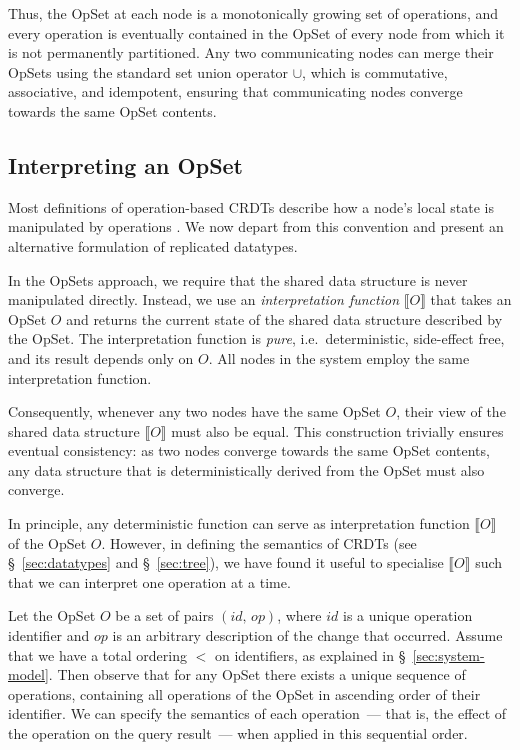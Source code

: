 Thus, the OpSet at each node is a monotonically growing set of operations, and every operation is eventually contained in the OpSet of every node from which it is not permanently partitioned.
Any two communicating nodes can merge their OpSets using the standard set union operator $\cup$, which is commutative, associative, and idempotent, ensuring that communicating nodes converge towards the same OpSet contents.

\subsection{Interpreting an OpSet}\label{sec:op-serial}

Most definitions of operation-based CRDTs describe how a node's local state is manipulated by operations \cite{Shapiro:2011wy,Shapiro:2011un}.
We now depart from this convention and present an alternative formulation of replicated datatypes.

In the OpSets approach, we require that the shared data structure is never manipulated directly.
Instead, we use an \emph{interpretation function} $\llbracket O \rrbracket$ that takes an OpSet $O$ and returns the current state of the shared data structure described by the OpSet.
The interpretation function is \emph{pure}, i.e.\ deterministic, side-effect free, and its result depends only on $O$.
All nodes in the system employ the same interpretation function.

Consequently, whenever any two nodes have the same OpSet $O$, their view of the shared data structure $\llbracket O \rrbracket$ must also be equal.
This construction trivially ensures eventual consistency: as two nodes converge towards the same OpSet contents, any data structure that is deterministically derived from the OpSet must also converge.

In principle, any deterministic function can serve as interpretation function $\llbracket O \rrbracket$ of the OpSet $O$.
However, in defining the semantics of CRDTs (see \S~\ref{sec:datatypes} and \S~\ref{sec:tree}), we have found it useful to specialise $\llbracket O \rrbracket$ such that we can interpret one operation at a time.

Let the OpSet $O$ be a set of pairs $(\mathit{id},\, \mathit{op})$, where $\mathit{id}$ is a unique operation identifier and $\mathit{op}$ is an arbitrary description of the change that occurred.
Assume that we have a total ordering $<$ on identifiers, as explained in \S~\ref{sec:system-model}.
Then observe that for any OpSet there exists a unique sequence of operations, containing all operations of the OpSet in ascending order of their identifier.
We can specify the semantics of each operation~--- that is, the effect of the operation on the query result~--- when applied in this sequential order.

